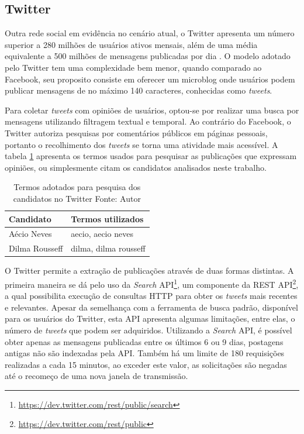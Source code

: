 \subsection{Twitter}

Outra rede social em evidência no cenário atual, o Twitter apresenta um número superior a 280 milhões de usuários ativos mensais, além de uma média equivalente a 500 milhões de mensagens publicadas por dia \cite{twitter-doc}. O modelo adotado pelo Twitter tem uma complexidade bem menor, quando comparado ao Facebook, seu proposito consiste em oferecer um microblog onde usuários podem publicar mensagens de no máximo 140 caracteres, conhecidas como \textit{tweets}.

Para coletar \textit{tweets} com opiniões de usuários, optou-se por realizar uma busca por mensagens utilizando filtragem textual e temporal. Ao contrário do Facebook, o Twitter autoriza pesquisas por comentários públicos em páginas pessoais, portanto o recolhimento dos \textit{tweets} se torna uma atividade mais acessível. A tabela \ref{tab-tw-nomes} apresenta os termos usados para pesquisar as publicações que expressam opiniões, ou simplesmente citam os candidatos analisados neste trabalho.

\begin{table}[!ht]
\begin{center}
  \begin{tabular}{|p{5cm}|p{5cm}|}
	\hline
	Candidato & Termos utilizados
	\\ \hline
	Aécio Neves & aecio, aecio neves
	\\ \hline
	Dilma Rousseff & dilma, dilma rousseff
	\\ \hline
  \end{tabular}
  \captionsetup{justification=centering}
  \caption[Termos adotados para pesquisa dos candidatos no Twitter]{Termos adotados para pesquisa dos candidatos no Twitter
  \protect\linebreak Fonte: Autor}
\label{tab-tw-nomes}
\end{center}
\end{table}
\FloatBarrier

O Twitter permite a extração de publicações através de duas formas distintas. A primeira maneira se dá pelo uso da \textit{Search} API\footnote{\url{https://dev.twitter.com/rest/public/search}}, um componente da REST API\footnote{\url{https://dev.twitter.com/rest/public}}, a qual possibilita execução de consultas HTTP para obter os \textit{tweets} mais recentes e relevantes. Apesar da semelhança com a ferramenta de busca padrão, disponível para os usuários do Twitter, esta API apresenta algumas limitações, entre elas, o número de \textit{tweets} que podem ser adquiridos. Utilizando a \textit{Search} API, é possível obter apenas as mensagens publicadas entre os últimos 6 ou 9 dias, postagens antigas não são indexadas pela API. Também há um limite de 180 requisições realizadas a cada 15 minutos, ao exceder este valor, as solicitações são negadas até o recomeço de uma nova janela de transmissão.

